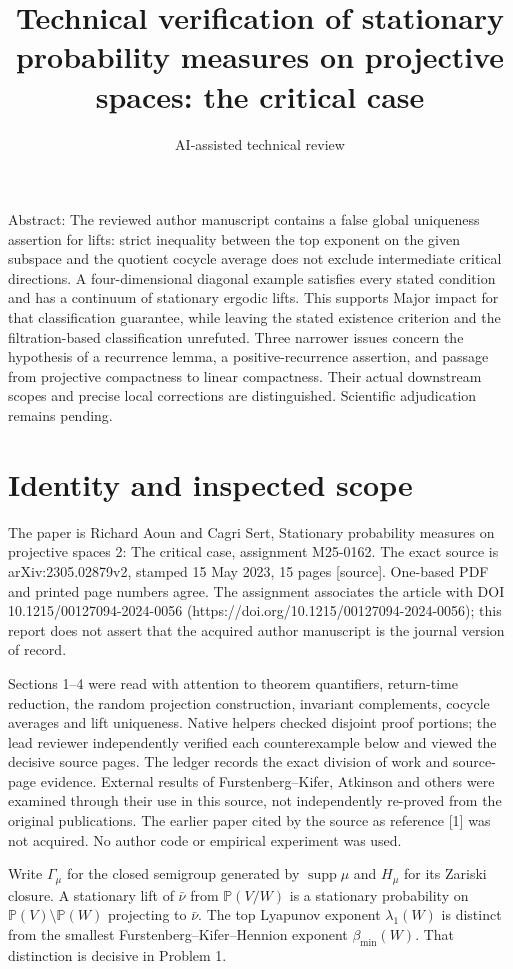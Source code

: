 \documentclass[10pt]{article}
\title{Technical verification of stationary probability measures on projective spaces: the critical case}
\author{AI-assisted technical review}
\date{}
\begin{document}
\maketitle
Abstract: The reviewed author manuscript contains a false global uniqueness assertion for lifts: strict inequality between the top exponent on the given subspace and the quotient cocycle average does not exclude intermediate critical directions. A four-dimensional diagonal example satisfies every stated condition and has a continuum of stationary ergodic lifts. This supports Major impact for that classification guarantee, while leaving the stated existence criterion and the filtration-based classification unrefuted. Three narrower issues concern the hypothesis of a recurrence lemma, a positive-recurrence assertion, and passage from projective compactness to linear compactness. Their actual downstream scopes and precise local corrections are distinguished. Scientific adjudication remains pending.\par
\section*{Identity and inspected scope}
The paper is Richard Aoun and Cagri Sert, Stationary probability measures on projective spaces 2: The critical case, assignment M25-0162. The exact source is arXiv:2305.02879v2, stamped 15 May 2023, 15 pages [source]. One-based PDF and printed page numbers agree. The assignment associates the article with DOI 10.1215/00127094-2024-0056 (https://doi.org/10.1215/00127094-2024-0056); this report does not assert that the acquired author manuscript is the journal version of record.\par
Sections 1–4 were read with attention to theorem quantifiers, return-time reduction, the random projection construction, invariant complements, cocycle averages and lift uniqueness. Native helpers checked disjoint proof portions; the lead reviewer independently verified each counterexample below and viewed the decisive source pages. The ledger records the exact division of work and source-page evidence. External results of Furstenberg–Kifer, Atkinson and others were examined through their use in this source, not independently re-proved from the original publications. The earlier paper cited by the source as reference [1] was not acquired. No author code or empirical experiment was used.\par
Write \(\Gamma_\mu\) for the closed semigroup generated by \(\operatorname{supp}\mu\) and \(H_\mu\) for its Zariski closure. A stationary lift of \(\bar\nu\) from \(\mathbb P(V/W)\) is a stationary probability on \(\mathbb P(V)\setminus\mathbb P(W)\) projecting to \(\bar\nu\). The top Lyapunov exponent \(\lambda_1(W)\) is distinct from the smallest Furstenberg–Kifer–Hennion exponent \(\beta_{\min}(W)\). That distinction is decisive in Problem 1.\par
\end{document}
